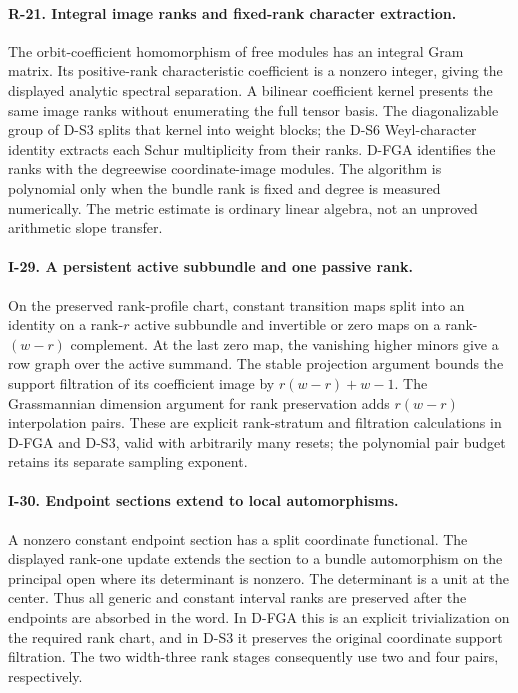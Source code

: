 \paragraph{R-21. Integral image ranks and fixed-rank character extraction.}
The orbit-coefficient homomorphism of free modules has an integral Gram
matrix. Its positive-rank characteristic coefficient is a nonzero
integer, giving the displayed analytic spectral separation. A bilinear
coefficient kernel presents the same image ranks without enumerating
the full tensor basis. The diagonalizable group of D-S3 splits that
kernel into weight blocks; the D-S6 Weyl-character identity extracts
each Schur multiplicity from their ranks. D-FGA identifies the ranks
with the degreewise coordinate-image modules. The algorithm is
polynomial only when the bundle rank is fixed and degree is measured
numerically. The metric estimate is ordinary linear algebra, not an
unproved arithmetic slope transfer.

\paragraph{I-29. A persistent active subbundle and one passive rank.}
On the preserved rank-profile chart, constant transition maps split
into an identity on a rank-$r$ active subbundle and invertible or zero
maps on a rank-$(w-r)$ complement. At the last zero map, the vanishing
higher minors give a row graph over the active summand. The stable
projection argument bounds the support filtration of its coefficient
image by $r(w-r)+w-1$. The Grassmannian dimension argument for rank
preservation adds $r(w-r)$ interpolation pairs. These are explicit
rank-stratum and filtration calculations in D-FGA and D-S3, valid with
arbitrarily many resets; the polynomial pair budget retains its
separate sampling exponent.

\paragraph{I-30. Endpoint sections extend to local automorphisms.}
A nonzero constant endpoint section has a split coordinate functional.
The displayed rank-one update extends the section to a bundle
automorphism on the principal open where its determinant is nonzero.
The determinant is a unit at the center. Thus all generic and constant
interval ranks are preserved after the endpoints are absorbed in the
word. In D-FGA this is an explicit trivialization on the required rank
chart, and in D-S3 it preserves the original coordinate support
filtration. The two width-three rank stages consequently use two and
four pairs, respectively.

